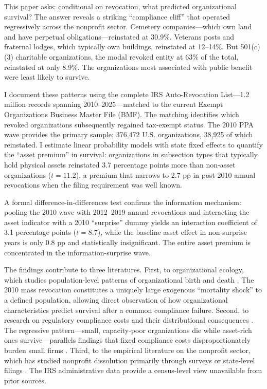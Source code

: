 \documentclass[12pt]{article}
\begin{document}
This paper asks: conditional on revocation, what predicted organizational survival? The answer reveals a striking ``compliance cliff'' that operated regressively across the nonprofit sector. Cemetery companies---which own land and have perpetual obligations---reinstated at 30.9\%. Veterans posts and fraternal lodges, which typically own buildings, reinstated at 12--14\%. But 501(c)(3) charitable organizations, the modal revoked entity at 63\% of the total, reinstated at only 8.9\%. The organizations most associated with public benefit were least likely to survive.

I document these patterns using the complete IRS Auto-Revocation List---1.2 million records spanning 2010--2025---matched to the current Exempt Organizations Business Master File (BMF). The matching identifies which revoked organizations subsequently regained tax-exempt status. The 2010 PPA wave provides the primary sample: 376,472 U.S. organizations, 38,925 of which reinstated. I estimate linear probability models with state fixed effects to quantify the ``asset premium'' in survival: organizations in subsection types that typically hold physical assets reinstated 3.7 percentage points more than non-asset organizations ($t = 11.2$), a premium that narrows to 2.7 pp in post-2010 annual revocations when the filing requirement was well known.

A formal difference-in-differences test confirms the information mechanism: pooling the 2010 wave with 2012--2019 annual revocations and interacting the asset indicator with a 2010 ``surprise'' dummy yields an interaction coefficient of 3.1 percentage points ($t = 8.7$), while the baseline asset effect in non-surprise years is only 0.8 pp and statistically insignificant. The entire asset premium is concentrated in the information-surprise wave.

The findings contribute to three literatures. First, to organizational ecology, which studies population-level patterns of organizational birth and death \citep{hannanfreeman1989, hannanetal2007}. The 2010 mass revocation constitutes a uniquely large exogenous ``mortality shock'' to a defined population, allowing direct observation of how organizational characteristics predict survival after a common compliance failure. Second, to research on regulatory compliance costs and their distributional consequences \citep{crain2010, decker2016, goldschlag2017}. The regressive pattern---small, capacity-poor organizations die while asset-rich ones survive---parallels findings that fixed compliance costs disproportionately burden small firms \citep{kitchingetal2015}. Third, to the empirical literature on the nonprofit sector, which has studied nonprofit dissolution primarily through surveys or state-level filings \citep{hageretal2004, helmserwin2007, nevill2009}. The IRS administrative data provide a census-level view unavailable from prior sources.
\end{document}
